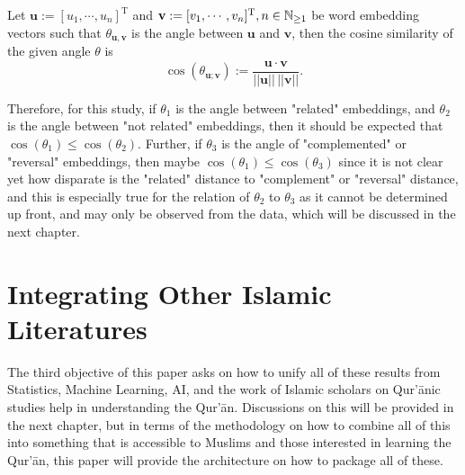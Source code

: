 \begin{defn}\label{defn:cosine_similarity}
    Let $\mathbf{u}:=[u_1,\cdots,u_n]^{\text{T}}$ and $\mathbf{v}:=[v_1,\cdots,v_n]^{\text{T}},\linebreak n\in\mathbb{N}_{\geq 1}$ be word embedding vectors such that $\theta_{\mathbf{u},\mathbf{v}}$ is the angle between $\mathbf{u}$ and $\mathbf{v}$, then the cosine similarity of the given angle $\theta$ is
    \begin{equation}
        \cos(\theta_{\mathbf{u};\mathbf{v}}):=\frac{\mathbf{u}\cdot\mathbf{v}}{||\mathbf{u}||\,||\mathbf{v}||}.
    \end{equation}
\end{defn}
Therefore, for this study, if $\theta_1$ is the angle between "related"   embeddings, and $\theta_2$ is the angle between "not related"   embeddings, then it should be expected that $\cos(\theta_1)\leq\cos(\theta_2)$. Further, if $\theta_3$ is the angle of "complemented" or "reversal"   embeddings, then maybe $\cos(\theta_1)\leq\cos(\theta_3)$ since it is not clear yet how disparate is the "related" distance to "complement" or "reversal" distance, and this is especially true for the relation of $\theta_2$ to $\theta_3$ as it cannot be determined up front, and may only be observed from the data, which will be discussed in the next chapter.
\section{Integrating Other Islamic Literatures}
The third objective of this paper asks on how to unify all of these results from Statistics, Machine Learning, AI, and the work of Islamic scholars on Qur'\=anic studies help in understanding the Qur'\=an. Discussions on this will be provided in the next chapter, but in terms of the methodology on how to combine all of this into something that is accessible to Muslims and those interested in learning the Qur'\=an, this paper will provide the architecture on how to package all of these.

